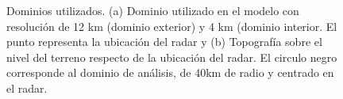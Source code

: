 \documentclass[12pt,spanish,oneside, a4paper]{book}
\begin{document}
\begin{figure}

{\centering {}\hfill{}

}

\caption{Dominios utilizados. (a) Dominio utilizado en el modelo con resolución de 12 km (dominio exterior) y 4 km (dominio interior. El punto representa la ubicación del radar y (b) Topografía sobre el nivel del terreno respecto de la ubicación del radar. El circulo negro corresponde al dominio de análisis, de 40km de radio y centrado en el radar. \label{dominio}}\label{fig:dominio}
\end{figure}
\end{document}
